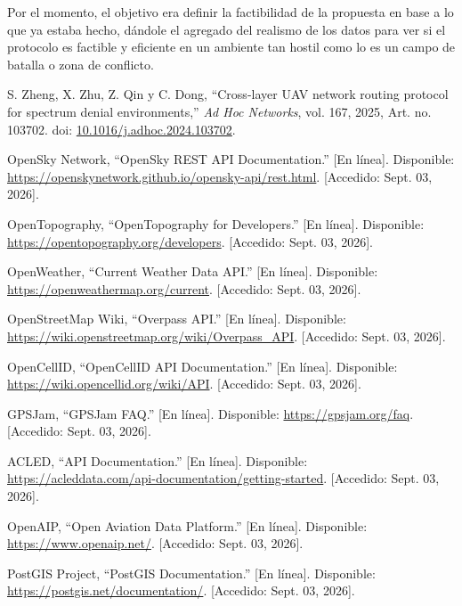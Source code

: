 \documentclass[journal,10pt]{IEEEtran}
\begin{document}
Por el momento, el objetivo era definir la factibilidad de la propuesta en base a lo que ya estaba hecho, dándole el agregado del realismo de los datos para ver si el protocolo es factible y eficiente en un ambiente tan hostil como lo es un campo de batalla o zona de conflicto.

\begin{thebibliography}{}

S. Zheng, X. Zhu, Z. Qin y C. Dong,
``Cross-layer UAV network routing protocol for spectrum denial environments,''
\emph{Ad Hoc Networks}, vol. 167, 2025, Art. no. 103702.
doi: \url{10.1016/j.adhoc.2024.103702}.

OpenSky Network, ``OpenSky REST API Documentation.''
[En línea]. Disponible:
\url{https://openskynetwork.github.io/opensky-api/rest.html}.
[Accedido: Sept. 03, 2026].

OpenTopography, ``OpenTopography for Developers.''
[En línea]. Disponible:
\url{https://opentopography.org/developers}.
[Accedido: Sept. 03, 2026].

OpenWeather, ``Current Weather Data API.''
[En línea]. Disponible:
\url{https://openweathermap.org/current}.
[Accedido: Sept. 03, 2026].

OpenStreetMap Wiki, ``Overpass API.''
[En línea]. Disponible:
\url{https://wiki.openstreetmap.org/wiki/Overpass_API}.
[Accedido: Sept. 03, 2026].

OpenCellID, ``OpenCellID API Documentation.''
[En línea]. Disponible:
\url{https://wiki.opencellid.org/wiki/API}.
[Accedido: Sept. 03, 2026].

GPSJam, ``GPSJam FAQ.''
[En línea]. Disponible:
\url{https://gpsjam.org/faq}.
[Accedido: Sept. 03, 2026].

ACLED, ``API Documentation.''
[En línea]. Disponible:
\url{https://acleddata.com/api-documentation/getting-started}.
[Accedido: Sept. 03, 2026].

OpenAIP, ``Open Aviation Data Platform.''
[En línea]. Disponible:
\url{https://www.openaip.net/}.
[Accedido: Sept. 03, 2026].

PostGIS Project, ``PostGIS Documentation.''
[En línea]. Disponible:
\url{https://postgis.net/documentation/}.
[Accedido: Sept. 03, 2026].

\end{thebibliography}
\end{document}
